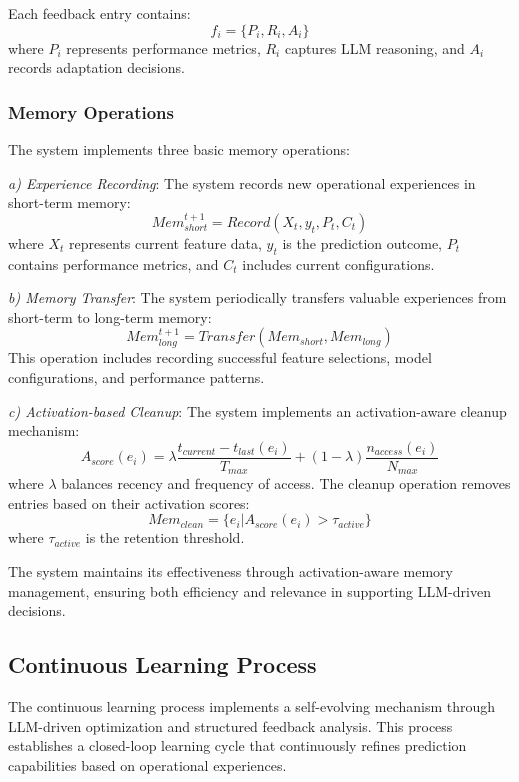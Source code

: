 \documentclass[conference]{IEEEtran}
\begin{document}
Each feedback entry contains:
\begin{equation}
    f_i = \{P_i, R_i, A_i\}
\end{equation}
where $P_i$ represents performance metrics, $R_i$ captures LLM reasoning, and $A_i$ records adaptation decisions.

\subsubsection{Memory Operations}
The system implements three basic memory operations:

\textit{a) Experience Recording}: The system records new operational experiences in short-term memory:
\begin{equation}
    Mem_{short}^{t+1} = Record(X_t, y_t, P_t, C_t)
\end{equation}
where $X_t$ represents current feature data, $y_t$ is the prediction outcome, $P_t$ contains performance metrics, and $C_t$ includes current configurations.

\textit{b) Memory Transfer}: The system periodically transfers valuable experiences from short-term to long-term memory:
\begin{equation}
    Mem_{long}^{t+1} = Transfer(Mem_{short}, Mem_{long})
\end{equation}
This operation includes recording successful feature selections, model configurations, and performance patterns.

\textit{c) Activation-based Cleanup}: The system implements an activation-aware cleanup mechanism:
\begin{equation}
    A_{score}(e_i) = \lambda\frac{t_{current} - t_{last}(e_i)}{T_{max}} + (1-\lambda)\frac{n_{access}(e_i)}{N_{max}}
\end{equation}
where $\lambda$ balances recency and frequency of access. The cleanup operation removes entries based on their activation scores:
\begin{equation}
    Mem_{clean} = \{e_i | A_{score}(e_i) > \tau_{active}\}
\end{equation}
where $\tau_{active}$ is the retention threshold.

The system maintains its effectiveness through activation-aware memory management, ensuring both efficiency and relevance in supporting LLM-driven decisions.
    
\subsection{Continuous Learning Process}
The continuous learning process implements a self-evolving mechanism through LLM-driven optimization and structured feedback analysis. This process establishes a closed-loop learning cycle that continuously refines prediction capabilities based on operational experiences.
\end{document}
